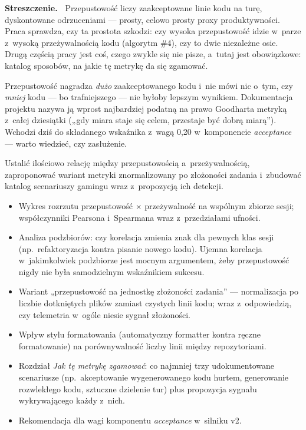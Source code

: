 \documentclass[11pt,a4paper]{article}
\newcommand{\blok}[1]{\vspace{0.2em}\noindent{\bfseries\color{csblue}#1}\par\nopagebreak}
\newenvironment{streszczenie}%
  {\vspace{-0.7em}\begin{shaded}\noindent\textbf{Streszczenie.\ }}%
  {\end{shaded}\vspace{-0.5em}}
\begin{document}
\begin{streszczenie}
Przepustowość liczy zaakceptowane linie kodu na turę, dyskontowane
odrzuceniami --- prosty, celowo prosty proxy produktywności. Praca sprawdza,
czy ta prostota szkodzi: czy wysoka przepustowość idzie w~parze z~wysoką
przeżywalnością kodu (algorytm \#4), czy to dwie niezależne osie. Drugą częścią
pracy jest coś, czego zwykle się nie pisze, a~tutaj jest obowiązkowe: katalog
sposobów, na jakie tę metrykę da się zgamować.
\end{streszczenie}

\blok{Kontekst i motywacja}
Przepustowość nagradza \emph{dużo} zaakceptowanego kodu i~nie mówi nic o~tym,
czy \emph{mniej} kodu --- bo trafniejszego --- nie byłoby lepszym wynikiem.
Dokumentacja projektu nazywa ją wprost najbardziej podatną na prawo Goodharta
metryką z~całej dziesiątki („gdy miara staje się celem, przestaje być dobrą
miarą''). Wchodzi dziś do składanego wskaźnika z~wagą 0{,}20 w~komponencie
\emph{acceptance} --- warto wiedzieć, czy zasłużenie.

\blok{Cel pracy}
Ustalić ilościowo relację między przepustowością a~przeżywalnością, zaproponować
wariant metryki znormalizowany po złożoności zadania i~zbudować katalog
scenariuszy gamingu wraz z~propozycją ich detekcji.

\blok{Zakres prac}
\begin{itemize}
  \item Wykres rozrzutu przepustowość $\times$ przeżywalność na wspólnym zbiorze
        sesji; współczynniki Pearsona i~Spearmana wraz z~przedziałami ufności.
  \item Analiza podzbiorów: czy korelacja zmienia znak dla pewnych klas sesji
        (np.\ refaktoryzacja kontra pisanie nowego kodu). Ujemna korelacja
        w~jakimkolwiek podzbiorze jest mocnym argumentem, żeby przepustowość
        nigdy nie była samodzielnym wskaźnikiem sukcesu.
  \item Wariant „przepustowość na jednostkę złożoności zadania'' --- normalizacja
        po liczbie dotkniętych plików zamiast czystych linii kodu; wraz
        z~odpowiedzią, czy telemetria w~ogóle niesie sygnał złożoności.
  \item Wpływ stylu formatowania (automatyczny formatter kontra ręczne
        formatowanie) na porównywalność liczby linii między repozytoriami.
  \item Rozdział \textit{Jak tę metrykę zgamować}: co najmniej trzy
        udokumentowane scenariusze (np.\ akceptowanie wygenerowanego kodu
        hurtem, generowanie rozwlekłego kodu, sztuczne dzielenie tur) plus
        propozycja sygnału wykrywającego każdy z~nich.
  \item Rekomendacja dla wagi komponentu \emph{acceptance} w~silniku v2.
\end{itemize}
\end{document}
